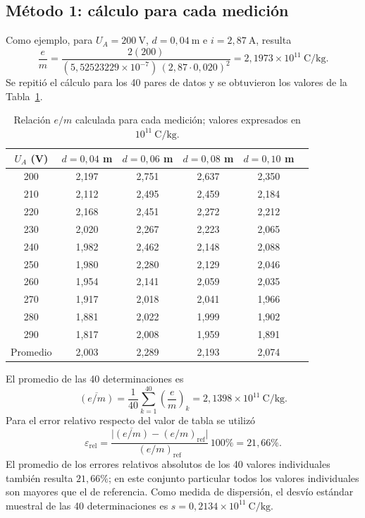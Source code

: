 \documentclass{article}
\begin{document}
\subsection{Método 1: cálculo para cada medición}
Como ejemplo, para $U_A=200\ \mathrm{V}$, $d=0{,}04\ \mathrm{m}$ e $i=2{,}87\ \mathrm{A}$, resulta
\begin{equation}
\frac em=\frac{2(200)}{(5{,}52523229\times10^{-7})\,{(2{,}87\cdot0{,}020)}^2}
=2{,}1973\times10^{11}\ \mathrm{C/kg}.
\end{equation}
Se repitió el cálculo para los 40 pares de datos y se obtuvieron los valores de la Tabla~\ref{tab:em}.

\begin{table}[H]
\centering\small
\setlength{\aboverulesep}{0pt}
\setlength{\belowrulesep}{0pt}
\caption{Relación $e/m$ calculada para cada medición; valores expresados en $10^{11}\ \mathrm{C/kg}$.}\label{tab:em}
\begin{tabular}{|c|c|c|c|c|c|} %
\toprule
$U_A$ (V) & $d=0{,}04$ m & $d=0{,}06$ m & $d=0{,}08$ m & $d=0{,}10$ m\\
\midrule
200 & 2,197 & 2,751 & 2,637 & 2,350\\
210 & 2,112 & 2,495 & 2,459 & 2,184\\
220 & 2,168 & 2,451 & 2,272 & 2,212\\
230 & 2,020 & 2,267 & 2,223 & 2,065\\
240 & 1,982 & 2,462 & 2,148 & 2,088\\
250 & 1,980 & 2,280 & 2,129 & 2,046\\
260 & 1,954 & 2,141 & 2,059 & 2,035\\
270 & 1,917 & 2,018 & 2,041 & 1,966\\
280 & 1,881 & 2,022 & 1,999 & 1,902\\
290 & 1,817 & 2,008 & 1,959 & 1,891\\
\midrule
Promedio & 2,003 & 2,289 & 2,193 & 2,074\\
\bottomrule
\end{tabular}
\end{table}

El promedio de las 40 determinaciones es
\begin{equation}
\overline{(e/m)}=\frac{1}{40}\sum_{k=1}^{40}{\left(\frac em\right)}_k
=\boxed{2{,}1398\times10^{11}\ \mathrm{C/kg}}.
\end{equation}
Para el error relativo respecto del valor de tabla se utilizó
\begin{equation}
\varepsilon_{\mathrm{rel}}=\frac{\bigl|\overline{(e/m)}-{(e/m)}_{\mathrm{ref}}\bigr|}{{(e/m)}_{\mathrm{ref}}}\,100\%
=\boxed{21{,}66\%}.
\end{equation}
El promedio de los errores relativos absolutos de los 40 valores individuales también resulta $21{,}66\%$; en este conjunto particular todos los valores individuales son mayores que el de referencia. Como medida de dispersión, el desvío estándar muestral de las 40 determinaciones es $s=0{,}2134\times10^{11}\ \mathrm{C/kg}$.
\end{document}
